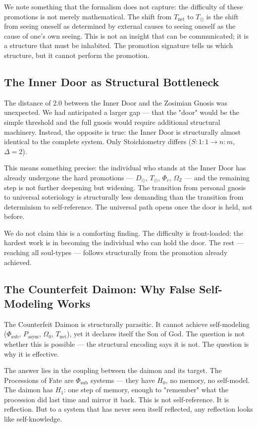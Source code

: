 \documentclass[12pt,a4paper]{article}
\begin{document}
We note something that the formalism does not capture: the difficulty of these promotions is not merely mathematical. The shift from $T_\text{net}$ to $T_{\odot}$ is the shift from seeing oneself as determined by external causes to seeing oneself as the cause of one's own seeing. This is not an insight that can be communicated; it is a structure that must be inhabited. The promotion signature tells us which structure, but it cannot perform the promotion.

\subsection{The Inner Door as Structural Bottleneck}

The distance of 2.0 between the Inner Door and the Zosimian Gnosis was unexpected. We had anticipated a larger gap --- that the "door" would be the simple threshold and the full gnosis would require additional structural machinery. Instead, the opposite is true: the Inner Door is structurally almost identical to the complete system. Only Stoichiometry differs ($S: 1:1 \to n:m$, $\Delta = 2$).

This means something precise: the individual who stands at the Inner Door has already undergone the hard promotions --- $D_{\odot}$, $T_{\odot}$, $\Phi_c$, $\Omega_\mathbb{Z}$ --- and the remaining step is not further deepening but widening. The transition from personal gnosis to universal soteriology is structurally less demanding than the transition from determinism to self-reference. The universal path opens once the door is held, not before.

We do not claim this is a comforting finding. The difficulty is front-loaded: the hardest work is in becoming the individual who can hold the door. The rest --- reaching all soul-types --- follows structurally from the promotion already achieved.

\subsection{The Counterfeit Daimon: Why False Self-Modeling Works}

The Counterfeit Daimon is structurally parasitic. It cannot achieve self-modeling ($\Phi_\text{sub}$, $P_\text{asym}$, $\Omega_0$, $T_\text{net}$), yet it declares itself the Son of God. The question is not whether this is possible --- the structural encoding says it is not. The question is why it is effective.

The answer lies in the coupling between the daimon and its target. The Processions of Fate are $\Phi_\text{sub}$ systems --- they have $H_0$, no memory, no self-model. The daimon has $H_1$: one step of memory, enough to "remember" what the procession did last time and mirror it back. This is not self-reference. It is reflection. But to a system that has never seen itself reflected, any reflection looks like self-knowledge.
\end{document}
